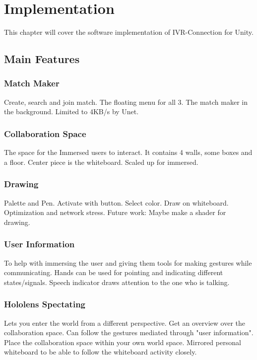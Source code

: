 \chapter{Implementation}
This chapter will cover the software implementation of IVR-Connection for Unity. %

    \section{Main Features}
    
        \subsection{Match Maker}
        Create, search and join match. The floating menu for all 3. The match maker in the background. Limited to 4KB/s by Unet. %
        
        \subsection{Collaboration Space}
        The space for the Immersed users to interact. It contains 4 walls, some boxes and a floor. Center piece is the whiteboard. Scaled up for immersed. %
        
        \subsection{Drawing}
        Palette and Pen. Activate with button. Select color. Draw on whiteboard. Optimization and network stress. Future work: Maybe make a shader for drawing. %
        
        \subsection{User Information} %
        To help with immersing the user and giving them tools for making gestures while communicating. Hands can be used for pointing and indicating different states/signals. Speech indicator draws attention to the one who is talking. %
        
        \subsection{Hololens Spectating}
        Lets you enter the world from a different perspective. Get an overview over the collaboration space. Can follow the gestures mediated through "user information". Place the collaboration space within your own world space. Mirrored personal whiteboard to be able to follow the whiteboard activity closely. %
        
